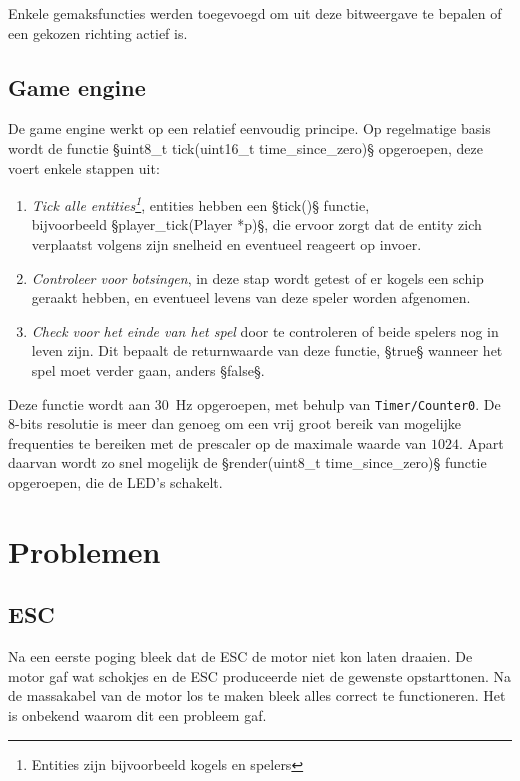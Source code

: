 \documentclass[12pt]{ugentreport}
\begin{document}
Enkele gemaksfuncties werden toegevoegd om uit deze bitweergave te bepalen of
een gekozen richting actief is.

\subsection{Game engine}
De game engine werkt op een relatief eenvoudig principe.
Op regelmatige basis wordt de functie §uint8_t tick(uint16_t time_since_zero)§
opgeroepen, deze voert enkele stappen uit:
\begin{enumerate}
  \item \emph{Tick alle entities\footnote{Entities zijn bijvoorbeeld kogels en
        spelers}}, entities hebben een §tick()§ functie,\\
    bijvoorbeeld §player_tick(Player *p)§, die ervoor zorgt dat de entity zich
    verplaatst volgens zijn snelheid en eventueel reageert op invoer.

  \item \emph{Controleer voor botsingen}, in deze stap wordt getest of er
    kogels een schip geraakt hebben, en eventueel levens van deze speler worden
    afgenomen.

  \item \emph{Check voor het einde van het spel} door te controleren of beide
    spelers nog in leven zijn. Dit bepaalt de returnwaarde van deze functie,
    §true§ wanneer het spel moet verder gaan, anders §false§.
\end{enumerate}

Deze functie wordt aan \SI{30}{\hertz} opgeroepen, met behulp van
\texttt{Timer/Counter0}. De 8-bits resolutie is meer dan genoeg om een vrij
groot bereik van mogelijke frequenties te bereiken met de prescaler op de
maximale waarde van $1024$.
Apart daarvan wordt zo snel mogelijk de §render(uint8_t time_since_zero)§
functie opgeroepen, die de LED's schakelt.

\section{Problemen}
\subsection{ESC}
Na een eerste poging bleek dat de ESC de motor niet kon laten draaien.
De motor gaf wat schokjes en de ESC produceerde niet de gewenste opstarttonen.
Na de massakabel van de motor los te maken bleek alles correct te functioneren.
Het is onbekend waarom dit een probleem gaf.
\end{document}

